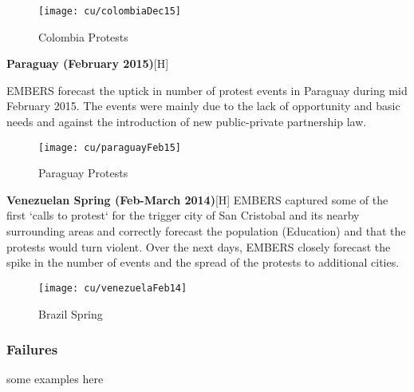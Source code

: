 \begin{figure}
\texttt{[image: cu/colombiaDec15]}
\caption{Colombia Protests}
\label{fig:colombiaDec14}
\end{figure}

\textbf{Paraguay (February 2015)}[H]

EMBERS forecast the uptick in number of protest events in Paraguay during mid
February 2015. The events were mainly due to the lack of opportunity and basic
needs and against the introduction of new public-private partnership law.


\begin{figure}
\texttt{[image: cu/paraguayFeb15]}
\caption{Paraguay Protests}
\label{fig:paraguay15}
\end{figure}

\textbf{Venezuelan Spring (Feb-March 2014)}[H]
EMBERS captured some of the first `calls to protest` for the trigger city of
San Cristobal and its nearby surrounding areas and correctly forecast the
population (Education) and that the protests would turn violent. Over the next
days, EMBERS closely forecast the spike in the number of events and the spread
of the protests to additional cities.

\begin{figure}
\texttt{[image: cu/venezuelaFeb14]}
\caption{Brazil Spring}
\label{fig:brazilSpring}
\end{figure}

\subsubsection{Failures}

some examples here
